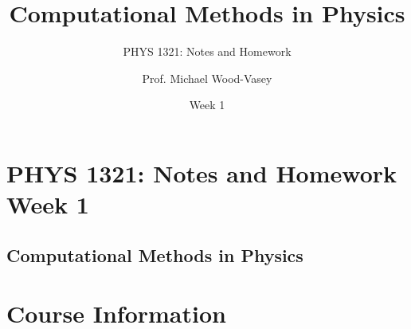

\usepackage[latin1]{inputenc}
\usepackage{listings}
\usepackage{times}


\title[PHYS 1321] %
{Computational Methods in Physics}

\subtitle{PHYS 1321: Notes and Homework}

\author[] %
{Prof. Michael Wood-Vasey}


\date[Week 1]{Week 1}



\lstset{language=Python, basicstyle=\footnotesize\ttfamily}

\begin{frame}
  \titlepage
\end{frame}

\section<article>{PHYS 1321: Notes and Homework \hfill Week 1}
\subsection<article>{Computational Methods in Physics}


\section{Course Information}



